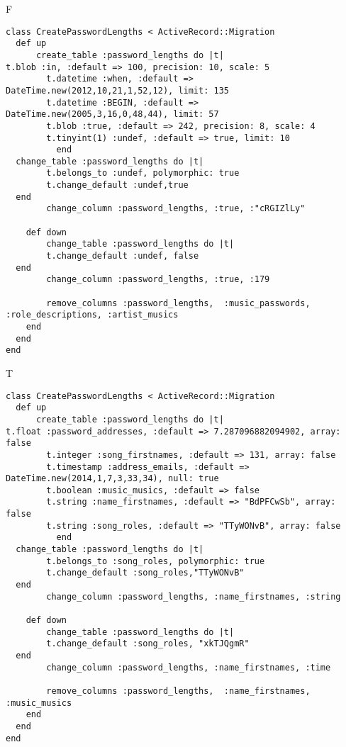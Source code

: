 F
\begin{verbatim}
class CreatePasswordLengths < ActiveRecord::Migration
  def up
	  create_table :password_lengths do |t|
t.blob :in, :default => 100, precision: 10, scale: 5
		t.datetime :when, :default => DateTime.new(2012,10,21,1,52,12), limit: 135
		t.datetime :BEGIN, :default => DateTime.new(2005,3,16,0,48,44), limit: 57
		t.blob :true, :default => 242, precision: 8, scale: 4
		t.tinyint(1) :undef, :default => true, limit: 10
		  end
  change_table :password_lengths do |t|
		t.belongs_to :undef, polymorphic: true
 		t.change_default :undef,true
  end
 		change_column :password_lengths, :true, :"cRGIZlLy"
   
	def down
		change_table :password_lengths do |t|
		t.change_default :undef, false
  end
 		change_column :password_lengths, :true, :179
   
		remove_columns :password_lengths,  :music_passwords, :role_descriptions, :artist_musics 
    end 
  end
end

\end{verbatim}

T
\begin{verbatim}
class CreatePasswordLengths < ActiveRecord::Migration
  def up
	  create_table :password_lengths do |t|
t.float :password_addresses, :default => 7.287096882094902, array: false
		t.integer :song_firstnames, :default => 131, array: false
		t.timestamp :address_emails, :default => DateTime.new(2014,1,7,3,33,34), null: true
		t.boolean :music_musics, :default => false
		t.string :name_firstnames, :default => "BdPFCwSb", array: false
		t.string :song_roles, :default => "TTyWONvB", array: false
		  end
  change_table :password_lengths do |t|
		t.belongs_to :song_roles, polymorphic: true
 		t.change_default :song_roles,"TTyWONvB"
  end
 		change_column :password_lengths, :name_firstnames, :string
   
	def down
		change_table :password_lengths do |t|
		t.change_default :song_roles, "xkTJQgmR"
  end
 		change_column :password_lengths, :name_firstnames, :time
   
		remove_columns :password_lengths,  :name_firstnames, :music_musics 
    end 
  end
end

\end{verbatim}

